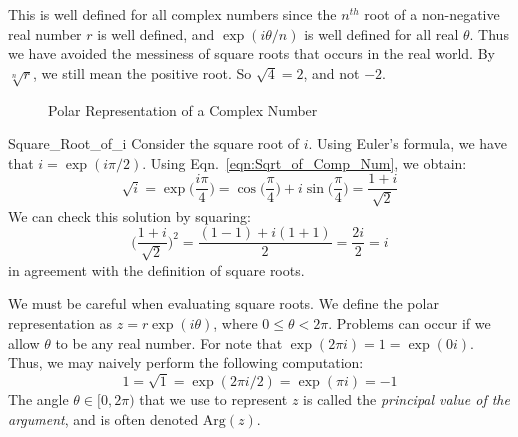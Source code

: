     This is well defined for all complex numbers since the $n^{th}$
    root of a non-negative real number $r$ is well defined, and
    $\exp(i\theta/n)$ is well defined for all real $\theta$. Thus we
    have avoided the messiness of square roots that occurs in the real
    world. By $\sqrt[n]{r}$, we still mean the positive root.
    So $\sqrt{4}=2$, and not $\minus{2}$.
    \begin{figure}[H]
        \centering
        \captionsetup{type=figure}
        
        \caption{Polar Representation of a Complex Number}
        \label{fig:Comp_Num_Polar}
    \end{figure}
    \begin{lexample}{}{Square_Root_of_i}
        Consider the square root of $i$. Using Euler's formula, we
        have that $i=\exp(i\pi/2)$. Using
        Eqn.~\ref{eqn:Sqrt_of_Comp_Num}, we obtain:
        \begin{equation}
            \sqrt{i}=\exp\big(\frac{i\pi}{4}\big)
                    =\cos\big(\frac{\pi}{4}\big)
                        +i\sin\big(\frac{\pi}{4}\big)
                    =\frac{1+i}{\sqrt{2}}
        \end{equation}
        We can check this solution by squaring:
        \begin{equation}
            \Big(\frac{1+i}{\sqrt{2}}\Big)^{2}=\frac{(1-1)+i(1+1)}{2}
                                              =\frac{2i}{2}
                                              =i
        \end{equation}
        in agreement with the definition of square roots.
    \end{lexample}
    We must be careful when evaluating square roots. We define the polar
    representation as $z=r\exp(i\theta)$, where
    $0\leq\theta<2\pi$. Problems can occur if we allow $\theta$ to be
    any real number. For note that $\exp(2\pi{i})=1=\exp(0i)$. Thus, we
    may naively perform the following computation:
    \begin{equation}
        1=\sqrt{1}=\exp(2\pi{i}/2)=\exp(\pi{i})=\minus{1}
    \end{equation}
    The angle $\theta\in[0,2\pi)$ that we use to represent $z$ is called
    the \textit{principal value of the argument}, and is often denoted
    $\mathrm{Arg}(z)$.
